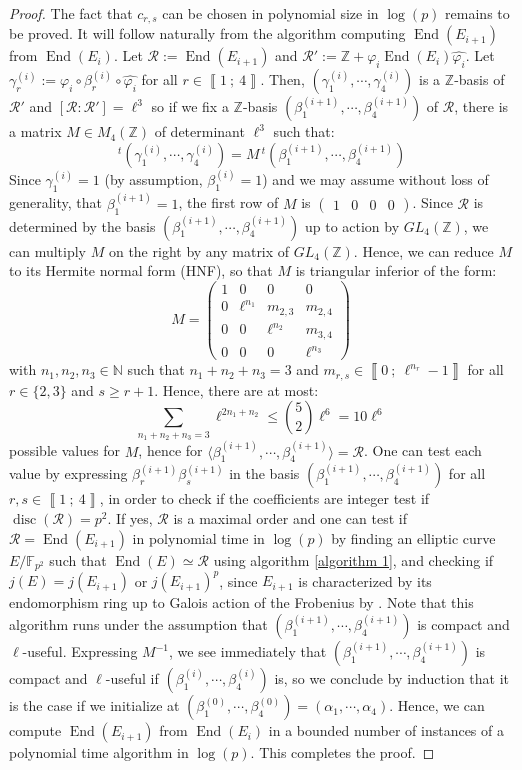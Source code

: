 \documentclass[a4paper,10pt]{report}
\theoremstyle{definition}
\theoremstyle{plain}
\theoremstyle{definition}
\newcommand{\N}{\mathbb{N}}
\newcommand{\Z}{\mathbb{Z}}
\newcommand{\F}{\mathbb{F}}
\newcommand{\m}[1]{\mathcal{#1}}
\renewcommand{\i}[2]{\left\llbracket #1~;~#2\right\rrbracket}
\renewcommand{\(}{\left(}
\renewcommand{\)}{\right)}
\DeclareMathOperator{\End}{End}
\DeclareMathOperator{\disc}{disc}
\begin{document}
\begin{proof}
The fact that $c_{r,s}$ can be chosen in polynomial size in $\log(p)$ remains to be proved. It will follow naturally from the algorithm computing $\End(E_{i+1})$ from $\End(E_i)$. Let $\m{R}:=\End(E_{i+1})$ and $\m{R}':=\Z+\varphi_i\End(E_i)\widehat{\varphi_i}$.  Let $\gamma_r^{(i)}:=\varphi_i\circ\beta_r^{(i)}\circ\widehat{\varphi_i}$ for all $r\in\i{1}{4}$. Then, $(\gamma_1^{(i)},\cdots, \gamma_4^{(i)})$ is a $\Z$-basis of $\m{R}'$ and $[\m{R}:\m{R}']=\ell^3$ so if we fix a $\Z$-basis $(\beta_1^{(i+1)},\cdots, \beta_4^{(i+1)})$ of $\m{R}$, there is a matrix $M\in M_4(\Z)$ of determinant $\ell^3$ such that:
\[\,^t (\gamma_1^{(i)},\cdots, \gamma_4^{(i)})=M \,^t(\beta_1^{(i+1)},\cdots, \beta_4^{(i+1)})\]
Since $\gamma_1^{(i)}=1$ (by assumption, $\beta_1^{(i)}=1$) and we may assume without loss of generality, that $\beta_1^{(i+1)}=1$, the first row of $M$ is $(\begin{array}{cccc}
1 & 0 & 0 & 0
\end{array})$.  Since $\m{R}$ is determined by the basis $(\beta_1^{(i+1)},\cdots, \beta_4^{(i+1)})$ up to action by $GL_4(\Z)$, we can multiply $M$ on the right by any matrix of $GL_4(\Z)$. Hence, we can reduce $M$ to its Hermite normal form (HNF), so that $M$ is triangular inferior of the form:
\[M=\(\begin{array}{cccc}
1 & 0 & 0 & 0\\
0 & \ell^{n_1} & m_{2,3} & m_{2,4}\\
0 & 0 & \ell^{n_2} & m_{3,4} \\
0 & 0 & 0 & \ell^{n_3}
\end{array}\)\]
with $n_1,n_2,n_3\in\N$ such that $n_1+n_2+n_3=3$ and $m_{r,s}\in\i{0}{\ell^{n_r}-1}$ for all $r\in\{2,3\}$ and $s\geq r+1$. Hence, there are at most:
\[\sum_{n_1+n_2+n_3=3} \ell^{2n_1+n_2}\leq \binom{5}{2}\ell^{6}=10\ell^6\]
possible values for $M$, hence for $\langle\beta_1^{(i+1)},\cdots, \beta_4^{(i+1)}\rangle=\m{R}$. One can test each value by expressing $\beta_r^{(i+1)}\beta_s^{(i+1)}$ in the basis $(\beta_1^{(i+1)},\cdots, \beta_4^{(i+1)})$ for all $r,s\in\i{1}{4}$, in order to check if the coefficients are integer test if $\disc(\m{R})=p^2$.  If yes, $\m{R}$ is a maximal order and one can test if $\m{R}=\End(E_{i+1})$ in polynomial time in $\log(p)$ by finding an elliptic curve $E/\F_{p^2}$ such that $\End(E)\simeq\m{R}$ using algorithm \ref{algorithm 1}, and checking if $j(E)=j(E_{i+1})$ or $j(E_{i+1})^p$, since $E_{i+1}$ is characterized by its endomorphism ring up to Galois action of the Frobenius by \cite[lemma 42.4.1]{Voight}. Note that this algorithm runs under the assumption that $(\beta_1^{(i+1)},\cdots, \beta_4^{(i+1)})$ is compact and $\ell$-useful. Expressing $M^{-1}$, we see immediately that $(\beta_1^{(i+1)},\cdots, \beta_4^{(i+1)})$ is compact and $\ell$-useful if $(\beta_1^{(i)},\cdots, \beta_4^{(i)})$ is, so we conclude by induction that it is the case if we initialize at $(\beta_1^{(0)},\cdots, \beta_4^{(0)})=(\alpha_1,\cdots,\alpha_4)$. Hence, we can compute $\End(E_{i+1})$ from $\End(E_i)$ in a bounded number of instances of a polynomial time algorithm in $\log(p)$. This completes the proof. 
\end{proof}
\end{document}
